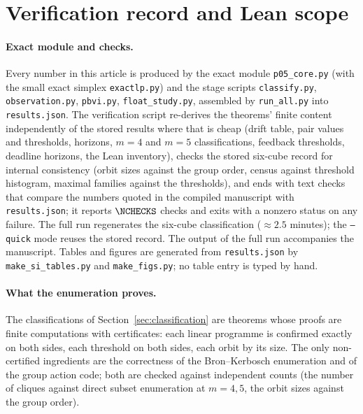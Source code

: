 \section{Verification record and Lean scope}\label{sec:verification}

\paragraph{Exact module and checks.}
Every number in this article is produced by the exact module \texttt{p05\_core.py} (with the small exact simplex \texttt{exactlp.py}) and the stage scripts \texttt{classify.py}, \texttt{observation.py}, \texttt{pbvi.py}, \texttt{float\_study.py}, assembled by \texttt{run\_all.py} into \texttt{results.json}. The verification script  re-derives the theorems' finite content independently of the stored results where that is cheap (drift table, pair values and thresholds, horizons, $m=4$ and $m=5$ classifications, feedback thresholds, deadline horizons, the Lean inventory), checks the stored six-cube record for internal consistency (orbit sizes against the group order, census against threshold histogram, maximal families against the thresholds), and ends with text checks that compare the numbers quoted in the compiled manuscript with \texttt{results.json}; it reports $\NCHECKS$ checks and exits with a nonzero status on any failure. The full run regenerates the six-cube classification ($\approx2.5$ minutes); the \texttt{--quick} mode reuses the stored record. The output of the full run accompanies the manuscript. Tables and figures are generated from \texttt{results.json} by \texttt{make\_si\_tables.py} and \texttt{make\_figs.py}; no table entry is typed by hand.

\paragraph{What the enumeration proves.}
The classifications of Section~\ref{sec:classification} are theorems whose proofs are finite computations with certificates: each linear programme is confirmed exactly on both sides, each threshold on both sides, each orbit by its size. The only non-certified ingredients are the correctness of the Bron--Kerbosch enumeration and of the group action code; both are checked against independent counts (the number of cliques against direct subset enumeration at $m=4,5$, the orbit sizes against the group order).

